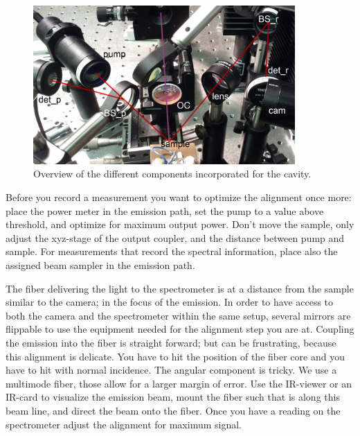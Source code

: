 \begin{figure}
\centering
\includegraphics[width=10cm]{img/cavity_all.jpg}
\caption{Overview of the different components incorporated for the cavity.}
\label{img:overview}
\end{figure}

Before you record a measurement
you want to optimize the alignment once more:
place the power meter
in the emission path,
set the pump to a value
above threshold,
and optimize
for maximum output power.
Don't move the sample,
only adjust
the xyz-stage
of the output coupler,
and the distance between
pump and sample.
For measurements
that record the spectral information,
place also the assigned beam sampler
in the emission path.

The fiber delivering the light
to the spectrometer
is at a distance
from the sample
similar to the camera;
in the focus of the emission.
In order to have access
to both the camera
and the spectrometer
within the same setup,
several mirrors
are flippable
to use the equipment needed for the alignment step
you are at.
Coupling the emission
into the fiber
is straight forward;
but can be frustrating,
because this alignment is delicate.
You have to hit the position of the fiber core
and you have to hit
with normal incidence.
The angular component
is tricky.
We use a multimode fiber,
those allow for a larger margin of error.
Use the IR-viewer or an IR-card
to visualize the emission beam,
mount the fiber
such that is along this beam line,
and direct the beam onto the fiber.
Once you have a reading
on the spectrometer
adjust the alignment
for maximum signal.

